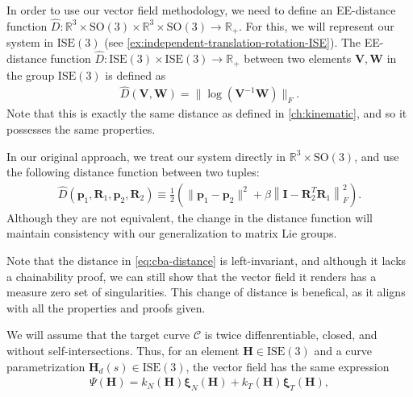 In order to use our vector field methodology, we need to define an EE-distance function $\widehat{D}:\mathbb{R}^3\times\text{SO}(3)\times\mathbb{R}^3\times\text{SO}(3)\to\mathbb{R}_+$. For this, we will represent our system in $\text{ISE}(3)$ (see \cref{ex:independent-translation-rotation-ISE}). The EE-distance function $\widehat{D}: \text{ISE}(3) \times \text{ISE}(3) \to \mathbb{R}_+$ between two elements $\mathbf{V}, \mathbf{W}$ in the group $\text{ISE}(3)$ is defined as
\begin{align}
    \widehat{D}(\mathbf{V}, \mathbf{W}) = \| \log(\mathbf{V}^{-1}\mathbf{W}) \|_F.
\end{align}
Note that this is exactly the same distance as defined in \cref{ch:kinematic}, and so it possesses the same properties.
\begin{remark}
    In our original approach, we treat our system directly in $\mathbb{R}^3\times\text{SO}(3)$, and use the following distance function between two tuples:
    \begin{align}
        \widehat{D}(\mathbf{p}_1, \mathbf{R}_1, \mathbf{p}_2, \mathbf{R}_2) \equiv \frac{1}{2}\left(\|\mathbf{p}_1 - \mathbf{p}_2\|^2 + \beta\left\|\mathbf{I} - \mathbf{R}_2^{T}\mathbf{R}_1\right\|^2_F\right). \label{eq:cba-distance}
    \end{align}
    Although they are not equivalent, the change in the distance function will maintain consistency with our generalization to matrix Lie groups.
    
    Note that the distance in \eqref{eq:cba-distance} is left-invariant, and although it lacks a chainability proof, we can still show that the vector field it renders has a measure zero set of singularities. This change of distance is benefical, as it aligns with all the properties and proofs given.
\end{remark}

We will assume that the target curve $\mathcal{C}$ is twice diffenrentiable, closed, and without self-intersections. Thus, for an element $\mathbf{H}\in\text{ISE}(3)$ and a curve parametrization $\mathbf{H}_d(s)\in\text{ISE}(3)$, the vector field has the same expression
\begin{align}
    \Psi(\mathbf{H}) = k_N(\mathbf{H})\boldsymbol{\xi}_N(\mathbf{H}) + k_T(\mathbf{H})\boldsymbol{\xi}_T(\mathbf{H}),
\end{align}


